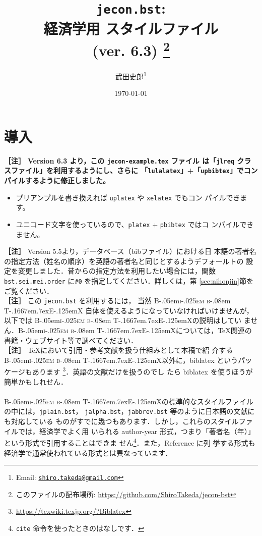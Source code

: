 \documentclass[article]{jlreq}
\title{\texttt{jecon.bst}:\\ 経済学用 \BibTeX{} スタイルファイル\\ (ver. 6.3)
\thanks{このファイルの配布場所: \url{https://github.com/ShiroTakeda/jecon-bst}}
}
\author{武田史郎\thanks{Email: \texttt{\href{mailto:shiro.takeda@gmail.com}{shiro.takeda@gmail.com}}}}
\date{\today}
\newcommand{\BibTeX}{\textrm{B\kern-.05em\textsc{i\kern-.025em b}\kern-.08em%
T\kern-.1667em\lower.7ex\hbox{E}\kern-.125emX}}
\newcommand{\midashii}[1]{\noindent \textbf{［#1］}}
\begin{document}
\maketitle

\tableofcontents


\section{導入}

\midashii{注} \textbf{Version 6.3 より，この \texttt{jecon-example.tex} ファイル
は「\texttt{jlreq} クラスファイル」を利用するようにし、さらに
「\texttt{lulalatex}」+「\texttt{upbibtex}」でコンパイルするように修正しました。}
\begin{itemize}
 \item プリアンプルを書き換えれば \texttt{uplatex} や \texttt{xelatex} でもコン
       パイルできます。
 \item ユニコード文字を使っているので、\texttt{platex} + \texttt{pbibtex} ではコ
       ンパイルできません。
\end{itemize}
\vspace*{1em}


\midashii{注} Version 5.5より，データベース（bibファイル）における日
本語の著者名の指定方法（姓名の順序）を英語の著者名と同じとするようデフォールトの
設定を変更しました．昔からの指定方法を利用したい場合には，関数
\texttt{bst.sei.mei.order} に\verb|#0| を指定してください．詳しくは，第
\ref{sec:nihonjin}節をご覧ください．
\\

\midashii{注} この \texttt{jecon.bst} を利用するには， 当然 \BibTeX
自体を使えるようになっていなければいけませんが，以下では \BibTeX の説明はしてい
ません．\BibTeX については，\TeX 関連の書籍・ウェブサイト等で調べてください．\\

\midashii{注} \TeX において引用・参考文献を扱う仕組みとして本稿で紹
介する \BibTeX 以外に，biblatex というパッケージもあります
\footnote{\url{https://texwiki.texjp.org/?Biblatex}}．英語の文献だけを扱うのでし
たら biblatex を使うほうが簡単かもしれせん．
\\
\\

\BibTeX の標準的なスタイルファイルの中には，\texttt{jplain.bst}，
\texttt{jalpha.bst}，\texttt{jabbrev.bst} 等のように日本語の文献にも対応している
ものがすでに幾つもあります．しかし，これらのスタイルファイルでは，経済学でよく用
いられる author-year 形式，つまり「著者名（年）」という形式で引用することはできま
せん\footnote{\texttt{cite} 命令を使ったときのはなしです．}．また，Reference に列
挙する形式も経済学で通常使われている形式とは異なっています．
\end{document}
